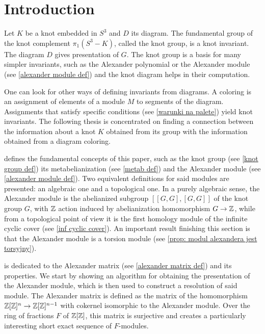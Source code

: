 \section*{Introduction}

Let $K$ be a knot embedded in $S^3$ and $D$ its diagram. The fundamental group of the knot complement $\pi_1(S^3-K)$, called the knot group, is a knot invariant. The diagram $D$ gives presentation of $G$. The knot group is a basis for many simpler invariants, such as the Alexander polynomial \cite{alex-oryginal} or the Alexander module (see \cref{alexander module def}) and the knot diagram helps in their computation. 

One can look for other ways of defining invariants from diagrams. A coloring is an assignment of elements of a module $M$ to segments of the diagram. 
Assignments that satisfy specific conditions (see \cref{warunki na palete}) yield knot invariants. 
The following thesis is concentrated on finding a connection between the information about a knot $K$ obtained from its group with the information obtained from a diagram coloring.

 defines the fundamental concepts of this paper, such as the knot group (see \cref{knot group def}) its metabelianization (see \cref{metab def}) and the Alexander module (see \cref{alexander module def}). Two equivalent definitions for said modules are presented: an algebraic one and a topological one. In a purely algebraic sense, the Alexander module is the abelianized subgroup $[[G, G], [G, G]]$ of the knot group $G$, with $\operatorname{\mathbb{Z}}$ action induced by abelianization homomorphism $G\to \operatorname{\mathbb{Z}}$, while from a topological point of view it is the first homology module of the infinite cyclic cover (see \cref{inf cyclic cover}). An important result finishing this section is that the Alexander module is a torsion module (see \cref{prop: modul alexandera jest torsyjny}).

 is dedicated to the Alexander matrix (see \cref{alexander matrix def}) and its properties. We start by showing an algorithm for obtaining the presentation of the Alexander module, which is then used to construct a resolution of said module. The Alexander matrix is defined as the matrix of the homomorphism $\operatorname{\mathbb{Z}}[\operatorname{\mathbb{Z}}]^n\to\operatorname{\mathbb{Z}}[\operatorname{\mathbb{Z}}]^{n-1}$ with cokernel isomorphic to the Alexander module.
Over the ring of fractions $F$ \cite[Cahpter~2]{atiyah} of $\operatorname{\mathbb{Z}}[\operatorname{\mathbb{Z}}]$, this matrix is surjective and creates a particularly interesting short exact sequence of $F$-modules.

